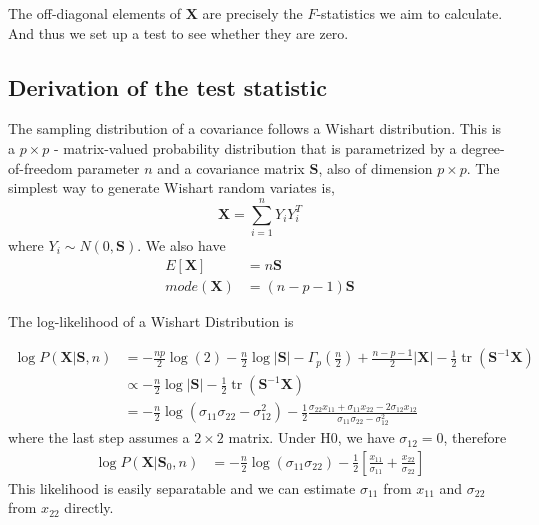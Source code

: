 \documentclass[12pt, letterpaper]{article}
\newcommand{\MX}{\mathbf{X}}
\newcommand{\MS}{\mathbf{S}}
\begin{document}
The off-diagonal elements of $\MX$ are precisely the $F$-statistics we aim to calculate. And thus we set up a test to see whether they are zero.


\subsection{Derivation of the test statistic}
The sampling distribution of a covariance follows a Wishart distribution. This is a $p \times p$ - matrix-valued probability distribution that is parametrized by a degree-of-freedom parameter $n$ and a covariance matrix $\MS$, also of dimension $p \times p$. The simplest way to generate Wishart random variates is, 
\begin{equation}
    \MX = \sum_{i=1}^n Y_i Y_i^T
\end{equation}
where $Y_i \sim N(0, \MS)$. We also have 
\begin{align}
    E[\MX] &= n\MS \\
    mode(\MX) &= (n-p-1) \MS
\end{align}

The log-likelihood of a Wishart Distribution is

\begin{align}
    \log P(\MX | \MS, n) &= -\frac{np}{2} \log(2) -  \frac{n}{2}\log\left|\MS\right| - \Gamma_p\left(\frac {n}{2}\right ) + \frac{n-p-1}{2} \left|\MX\right| -\frac{1}{2}\operatorname{tr}({\MS}^{-1}\MX)\\
    &\propto  -\frac{n}2\log\left|\MS\right|   -\frac{1}{2}\operatorname{tr}({\MS}^{-1}\MX)\nonumber\\
    &= -\frac{n}2 \log \left( \sigma_{11}\sigma_{22} - \sigma_{12}^2\right) - \frac{1}{2}\frac{\sigma_{22}x_{11} + \sigma_{11}x_{22} -2 \sigma_{12}x_{12}} {\sigma_{11}\sigma_{22} -  \sigma_{12}^2} 
\end{align}
where the last step assumes a $2\times 2$ matrix. 
Under H0, we have $\sigma_{12} = 0$, therefore
\begin{align}
    \log P(\MX | \MS_0, n) &= -\frac{n}2 \log \left( \sigma_{11}\sigma_{22}\right) - \frac{1}{2}\left[\frac{x_{11}}{\sigma_{11}}  + \frac{x_{22}}{\sigma_{22}}\right] 
\end{align}
This likelihood is easily separatable and we can estimate $\sigma_{11}$ from $x_{11}$ and $\sigma_{22}$ from $x_{22}$ directly.
\end{document}
